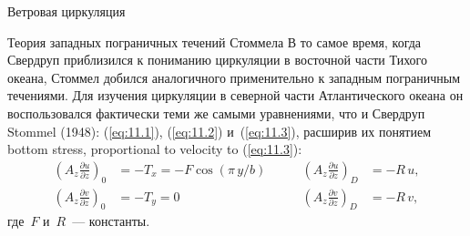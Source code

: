 \begin{chapter}{Ветровая циркуляция}
\begin{section}{Теория западных пограничных течений Стоммела}
%
В то самое время, когда Свердруп приблизился к пониманию циркуляции в восточной
части Тихого океана, Стоммел добился аналогичного применительно к западным
пограничным течениями. Для изучения циркуляции в северной части Атлантического
океана он воспользовался фактически теми же самыми 
уравнениями, что и Свердруп Stommel (1948): (\ref{eq:11.1}), (\ref{eq:11.2}) 
и~(\ref{eq:11.3}), расширив их понятием bottom stress, 
proportional to velocity to (\ref{eq:11.3}):
\begin{subequations}
\begin{alignat}{2}
\left(A_z \frac{\partial{u}}{\partial{z}}\right)_0 &= -T_x =-F\cos(\pi \,y/b)& \qquad \left(A_z \frac{\partial{u}}{\partial{z}}\right)_D &= -R\,u, \\
\left(A_z \frac{\partial{v}}{\partial{z}}\right)_0 &= -T_y =0 & \qquad \left(A_z \frac{\partial{v}}{\partial{z}}\right)_D &= -R\,v,
\end{alignat}
\end{subequations}
где~$F$ и~$R$~--- константы.
%


\end{section}
\end{chapter}
